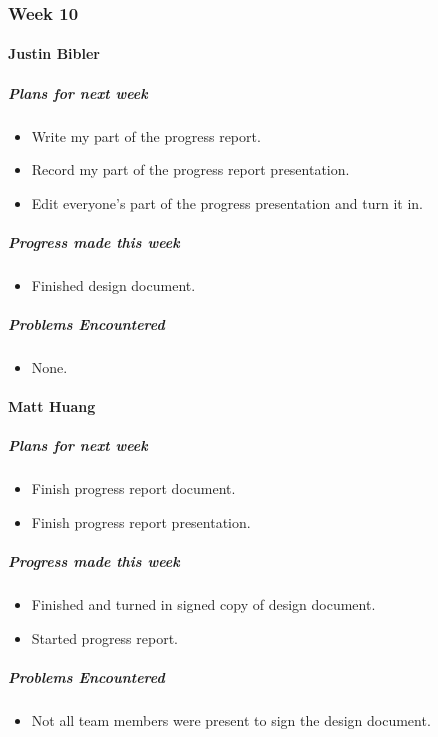 {
\subsubsection{Week 10}
\paragraph{Justin Bibler}
\subparagraph{Plans for next week}
\begin{itemize}
  \item Write my part of the progress report.
  \item Record my part of the progress report presentation.
  \item Edit everyone's part of the progress presentation and turn it in.
\end{itemize}

\subparagraph{Progress made this week}
\begin{itemize}
  \item Finished design document.
\end{itemize}

\subparagraph{Problems Encountered}
\begin{itemize}
  \item None.
\end{itemize}

\vspace{3mm}

\paragraph{Matt Huang}
\subparagraph{Plans for next week}
\begin{itemize}
  \item Finish progress report document.
  \item Finish progress report presentation.
\end{itemize}

\subparagraph{Progress made this week}
\begin{itemize}
  \item Finished and turned in signed copy of design document.
  \item Started progress report.
\end{itemize}

\subparagraph{Problems Encountered}
\begin{itemize}
  \item Not all team members were present to sign the design document.
\end{itemize}

}

